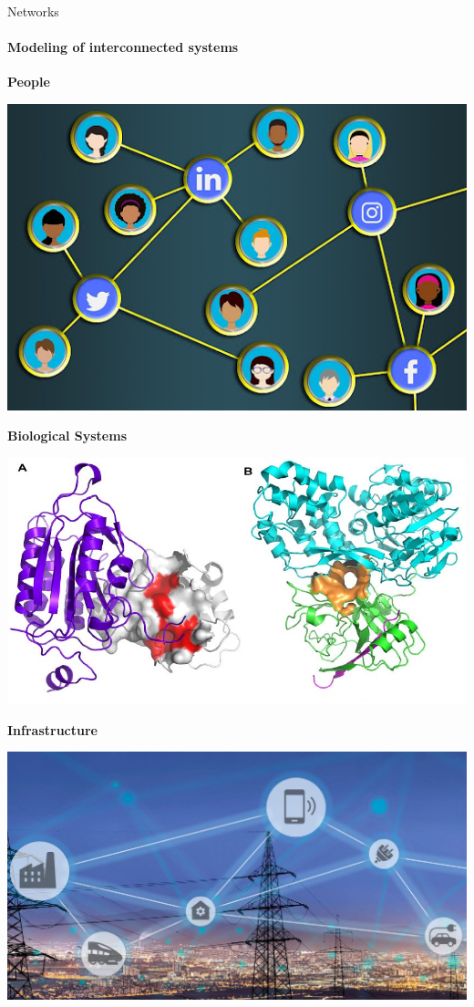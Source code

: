 \documentclass[10pt,titlepage,english,presentation]{beamer}
\begin{document}
\begin{frame}{Networks}
\framesubtitle{Modeling of interconnected systems}


\begin{minipage}[t]{.33\textwidth}
\centering
\textbf{People}\smallskip

\includegraphics[width=.9\textwidth]{./images/soc-net.jpg}
\end{minipage}\hfill
\begin{minipage}[t]{.33\textwidth}
\centering
\textbf{Biological Systems}\smallskip

\includegraphics[width=.9\textwidth]{./images/protein-protein-int-net.jpg}
\end{minipage}\hfill
\begin{minipage}[t]{.33\textwidth}
\centering
\textbf{Infrastructure}\smallskip

\includegraphics[width=.9\textwidth]{./images/smart-grid.jpg}
\end{minipage}\medskip


\end{frame}
\end{document}
